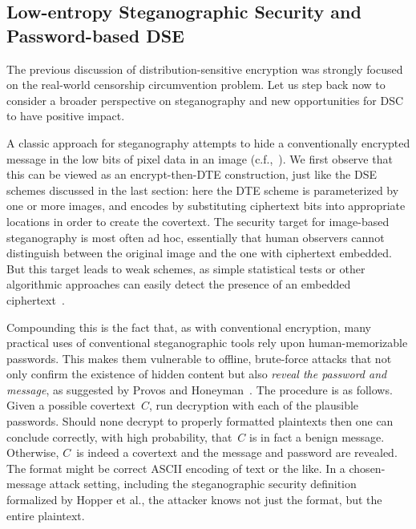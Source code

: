\subsection{Low-entropy Steganographic Security and Password-based DSE}
\label{sec:pwstego}
%
The previous discussion of distribution-sensitive encryption was
strongly focused on the real-world censorship circumvention
problem. Let us step back now to consider a broader perspective on
steganography and new opportunities for DSC to have positive impact.

A classic approach for steganography 
attempts to hide a conventionally encrypted message
in the low bits of pixel data in an image
(c.f.,~\cite{johnson1998exploring,cheddad2010digital,chandramouli2004image}).
We first observe that this can be viewed as an encrypt-then-DTE
construction, just like the DSE schemes discussed in the last section:
here the DTE scheme is parameterized by one or more images, and encodes by substituting
ciphertext bits into appropriate locations in order to create the
covertext. 
The security target for image-based steganography is most often ad hoc, essentially
that human observers cannot distinguish between the original image and
the one with ciphertext embedded. But
this target leads to weak schemes, as simple statistical tests or other
algorithmic approaches can easily detect the presence of an embedded
ciphertext~\cite{chandramouli2004image,provos2003hide}. 

Compounding this is the fact that,
as with conventional encryption, many practical uses of conventional 
steganographic tools rely upon human-memorizable passwords. 
This makes them vulnerable to offline,
brute-force attacks that not only confirm the existence of hidden content but
also \textit{reveal the password and message}, as suggested by Provos and
Honeyman~\cite{provos2003hide}. The procedure is as follows.
Given a possible covertext~$C$, run decryption with each of the
plausible passwords.  
Should none decrypt to properly formatted plaintexts then one can conclude correctly,
with high probability, that~$C$ is in fact a benign message.  Otherwise, $C$~is
indeed a covertext and the message and password are revealed. The format might
be correct ASCII encoding of text or the like.  In a chosen-message attack
setting, including the steganographic security definition formalized by Hopper
et al., the attacker knows not just the format, but the entire plaintext.

